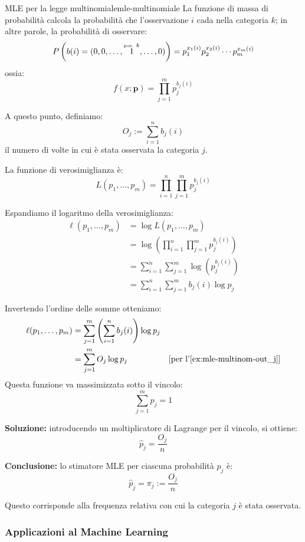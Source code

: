\begin{esempio}{MLE per la legge multinomiale}{mle-multinomiale}
La funzione di massa di probabilità calcola la probabilità che l'osservazione \(
i \) cada nella categoria \( k \); in altre parole, la probabilità di
osservare:
\[
P\left( b(i) = (0, 0, \ldots, 
\overset{\text{\tiny pos. } k}{1}, 
\ldots, 0) \right) = p_1^{x_1(i)} p_2^{x_2(i)} \cdots p_m^{x_m(i)}
\]
ossia:
\[
    f(x; \boldsymbol{p}) = \prod_{j=1}^m p_j^{b_j(i)}
\]


A questo punto, definiamo:
\begin{equation} \label{ex:mle-multinom-out_j}
    O_j := \sum_{i=1}^n b_j(i)
\end{equation}
il numero di volte in cui è stata osservata la categoria \( j \).

La funzione di verosimiglianza è:
\[
L(p_1, \dots, p_m) = \prod_{i=1}^n \prod_{j=1}^m p_j^{b_j(i)}
\]

Espandiamo il logaritmo della verosimiglianza:
\begin{align*}
\ell(p_1, \dots, p_m) 
&= \log L(p_1, \dots, p_m) \\
&= \log \left( \prod_{i=1}^n \prod_{j=1}^m p_j^{b_j(i)} \right) \\
&= \sum_{i=1}^n \sum_{j=1}^m \log \left( p_j^{b_j(i)} \right) \\
&= \sum_{i=1}^n \sum_{j=1}^m b_j(i) \log p_j
\end{align*}

Invertendo l'ordine delle somme otteniamo:
\begin{align*}
    \ell(p_1, \dots, p_m)
        &= \sum_{j=1}^m \left( \sum_{i=1}^n b_j(i) \right) \log p_j & \\
        &= \sum_{j=1}^m O_j \log p_j &\text{[per l'\Cref{ex:mle-multinom-out_j}]}
\end{align*}
Questa funzione va massimizzata sotto il vincolo:
\[
\sum_{j=1}^m p_j = 1
\]

\medskip

\textbf{Soluzione:} introducendo un moltiplicatore di Lagrange per il vincolo, si ottiene:
\[
\hat{p}_j = \frac{O_j}{n}
\]

\medskip
\textbf{Conclusione:} lo stimatore MLE per ciascuna probabilità \( p_j \) è:
\[
\hat{p}_j = \pi_j := \frac{O_j}{n}
\]

Questo corrisponde alla frequenza relativa con cui la categoria \( j \) è stata osservata.
\end{esempio}

\subsubsection{Applicazioni al Machine Learning}

